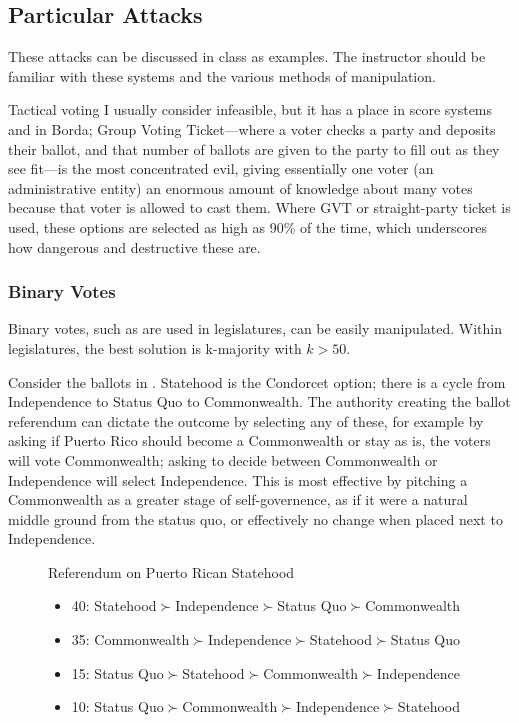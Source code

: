 \subsection{Particular Attacks}

These attacks can be discussed in class as examples.  The instructor should be familiar with these systems and the various methods of manipulation.

Tactical voting I usually consider infeasible, but it has a place in score systems and in Borda; Group Voting Ticket—where a voter checks a party and deposits their ballot, and that number of ballots are given to the party to fill out as they see fit—is the most concentrated evil, giving essentially one voter (an administrative entity) an enormous amount of knowledge about many votes because that voter is allowed to cast them.  Where GVT or straight-party ticket is used, these options are selected as high as 90\% of the time, which underscores how dangerous and destructive these are.

\subsubsection{Binary Votes}

Binary votes, such as are used in legislatures, can be easily manipulated.  Within legislatures, the best solution is k-majority with $k>50$.

Consider the ballots in .  Statehood is the Condorcet option; there is a cycle from Independence to Status Quo to Commonwealth.  The authority creating the ballot referendum can dictate the outcome by selecting any of these, for example by asking if Puerto Rico should become a Commonwealth or stay as is, the voters will vote Commonwealth; asking to decide between Commonwealth or Independence will select Independence.  This is most effective by pitching a Commonwealth as a greater stage of self-governence, as if it were a natural middle ground from the status quo, or effectively no change when placed next to Independence.

\begin{figure}[ht]
    \begin{election}
        \label{ele:pr-ref}
        Referendum on Puerto Rican Statehood

        \begin{itemize}
            \item 40: Statehood$\succ$Independence$\succ$Status Quo$\succ$Commonwealth
            \item 35: Commonwealth$\succ$Independence$\succ$Statehood$\succ$Status Quo
            \item 15: Status Quo$\succ$Statehood$\succ$Commonwealth$\succ$Independence
            \item 10: Status Quo$\succ$Commonwealth$\succ$Independence$\succ$Statehood
        \end{itemize}
    \end{election}
\end{figure}

